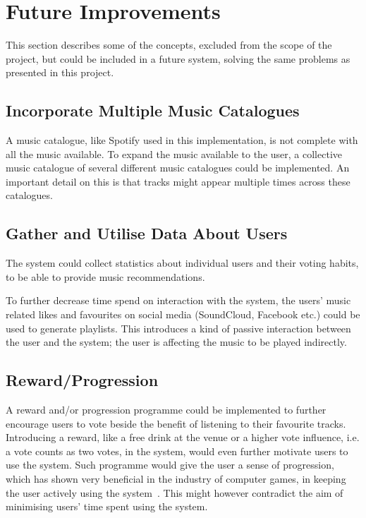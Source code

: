 \chapter{Future Improvements}
\label{future}

This section describes some of the concepts, excluded from the scope of the project, but could be included in a future system, solving the same problems as presented in this project.

\section{Incorporate Multiple Music Catalogues}
A music catalogue, like Spotify used in this implementation, is not complete with all the music available. To expand the music available to the user, a collective music catalogue of several different music catalogues could be implemented. An important detail on this is that tracks might appear multiple times across these catalogues.

\section{Gather and Utilise Data About Users}
The system could collect statistics about individual users and their voting habits, to be able to provide music recommendations.

To further decrease time spend on interaction with the system, the users' music related likes and favourites on social media (SoundCloud, Facebook etc.) could be used to generate playlists. This introduces a kind of passive interaction between the user and the system; the user is affecting the music to be played indirectly.

\section{Reward/Progression}
A reward and/or progression programme could be implemented to further encourage users to vote beside the benefit of listening to their favourite tracks. Introducing a reward, like a free drink at the venue or a higher vote influence, i.e. a vote counts as two votes, in the system, would even further motivate users to use the system. Such programme would give the user a sense of progression, which has shown very beneficial in the industry of computer games, in keeping the user actively using the system~\cite{games}. This might however contradict the aim of minimising users' time spent using the system.

